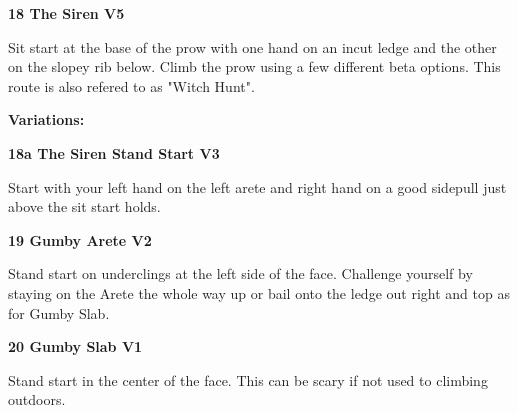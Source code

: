 \begin{multicols}{2}
		
			
			\needspace{1.5cm}
\label{rt:The Siren}
\colorbox{RoyalBlue!20}{
\parbox{0.95\linewidth}{
\textbf{
18 The Siren V5  
}}}

			\begin{adjustwidth}{0.5cm}{}			
			Sit start at the base of the prow with one hand on an incut ledge and the other on the slopey rib below. Climb the prow using a few different beta options. This route is also refered to as "Witch Hunt".
			\end{adjustwidth}
			
				\begin{adjustwidth}{0.5cm}{}				
				\needspace{3cm}
				\textbf{Variations:} \newline
					
					\needspace{1.5cm}
\label{vr:The Siren Stand Start}
\colorbox{green!20}{
\parbox{0.95\linewidth}{
\textbf{
18a The Siren Stand Start V3  
}}}

					\begin{adjustwidth}{0.5cm}{}			
					Start with your left hand on the left arete and right hand on a good sidepull just above the sit start holds.
					\end{adjustwidth}
					
					
				\end{adjustwidth}
			


			\needspace{1.5cm}
\label{rt:Gumby Arete}
\colorbox{green!20}{
\parbox{0.95\linewidth}{
\textbf{
19 Gumby Arete V2  
}}}

			\begin{adjustwidth}{0.5cm}{}			
			Stand start on underclings at the left side of the face. Challenge yourself by staying on the Arete the whole way up or bail onto the ledge out right and top as for Gumby Slab.
			\end{adjustwidth}
			
			
			
			\needspace{1.5cm}
\label{rt:Gumby Slab}
\colorbox{green!20}{
\parbox{0.95\linewidth}{
\textbf{
20 Gumby Slab V1  
}}}

			\begin{adjustwidth}{0.5cm}{}			
			Stand start in the center of the face. This can be scary if not used to climbing outdoors.
			\end{adjustwidth}
			

\end{multicols}
